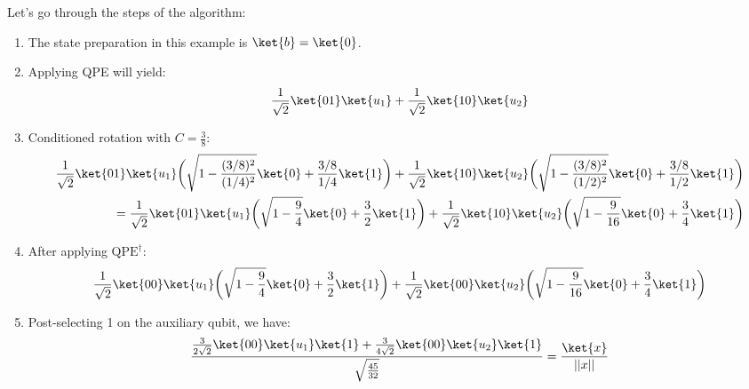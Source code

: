 Let's go through the steps of the algorithm:
\begin{enumerate}
    \item The state preparation in this example is $\ket{b}=\ket{0}$.
    \item Applying QPE will yield:
    \begin{equation*}
        \frac{1}{\sqrt{2}} \ket{01} \ket{u_1} + \frac{1}{\sqrt{2}} \ket{10} \ket{u_2}
    \end{equation*}
    \item Conditioned rotation with $C = \frac{3}{8}$:
    \begin{equation*}
    \begin{split}
        \frac{1}{\sqrt{2}} \ket{01} \ket{u_1} \bigg( \sqrt{1 - \frac{(3/8)^2}{(1/4)^2}} \ket{0} + \frac{3/8}{1/4} \ket{1} \bigg) + \frac{1}{\sqrt{2}} \ket{10} \ket{u_2} \bigg( \sqrt{1 - \frac{(3/8)^2}{(1/2)^2}} \ket{0} + \frac{3/8}{1/2} \ket{1} \bigg) \\ 
        = \frac{1}{\sqrt{2}} \ket{01} \ket{u_1} \bigg( \sqrt{1 - \frac{9}{4}} \ket{0} + \frac{3}{2} \ket{1} \bigg) + \frac{1}{\sqrt{2}} \ket{10} \ket{u_2} \bigg( \sqrt{1 - \frac{9}{16}} \ket{0} + \frac{3}{4} \ket{1} \bigg)
    \end{split}
    \end{equation*}
    
    \item After applying $\text{QPE}^\dagger$:
    \begin{equation*}
        \frac{1}{\sqrt{2}} \ket{00} \ket{u_1} \bigg( \sqrt{1 - \frac{9}{4}} \ket{0} + \frac{3}{2} \ket{1} \bigg) + \frac{1}{\sqrt{2}} \ket{00} \ket{u_2} \bigg( \sqrt{1 - \frac{9}{16}} \ket{0} + \frac{3}{4} \ket{1} \bigg)
    \end{equation*}
    
    \item Post-selecting 1 on the auxiliary qubit, we have:
    \begin{equation*}
        \frac{\frac{3}{2\sqrt{2}} \ket{00} \ket{u_1} \ket{1} + \frac{3}{4\sqrt{2}} \ket{00} \ket{u_2} \ket{1}}{\sqrt{\frac{45}{32}}} = \frac{\ket{x}}{||x||}
    \end{equation*}
\end{enumerate}